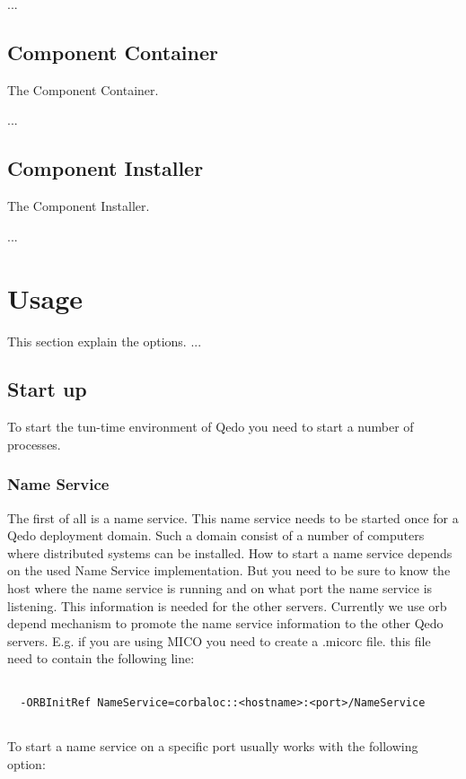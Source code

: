 \documentclass[12pt,a4paper]{report}
\begin{document}
 ... 

\section{Component Container}
\label{sec:ComponentContainer}
The Component Container. 

...

\section{Component Installer}
\label{sec:ComponentInstaller}
The Component Installer.

...

\chapter{Usage}
\label{sec:Usage}
This section explain the options. ...

\section{Start up}
\label{sec:StartUp}
To start the tun-time environment of Qedo you need to start a number of processes. 

\subsection{Name Service}
\label{sec:NameService}

The first of all is a name service. This name service needs to be started once for a Qedo deployment domain. Such a domain consist of a number of computers where distributed systems can be installed. How to start a name service depends on the used Name Service implementation. But you need to be sure to know the host where the name service is running and on what port the name service is listening. This information is needed for the other servers. Currently we use orb depend mechanism to promote the name service information to the other Qedo servers. E.g. if you are using MICO you need to create a .micorc file. this file need to contain the following line:
\small
\begin{verbatim}

  -ORBInitRef NameService=corbaloc::<hostname>:<port>/NameService
  
\end{verbatim}
\normalsize

To start a name service on a specific port usually works with the following option:
\end{document}
